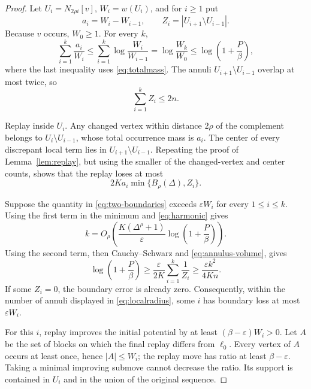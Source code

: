 \documentclass[11pt]{article}
\theoremstyle{definition}
\theoremstyle{remark}
\newcommand{\eps}{\varepsilon}
\newcommand{\N}{N}
\begin{document}
\begin{proof}
Let $U_i=\N_{2\rho i}[v]$, $W_i=w(U_i)$, and for $i\geq1$ put
\[
 a_i=W_i-W_{i-1},
 \qquad
 Z_i=|U_{i+1}\setminus U_{i-1}|.
\]
Because $v$ occurs, $W_0\geq1$.  For every $k$,
\begin{equation}\label{eq:harmonic}
 \sum_{i=1}^k\frac{a_i}{W_i}
 \leq \sum_{i=1}^k\log\frac{W_i}{W_{i-1}}
 =\log\frac{W_k}{W_0}
 \leq\log\!\left(1+\frac{P}{\beta}\right),
\end{equation}
where the last inequality uses \eqref{eq:totalmass}.  The annuli
$U_{i+1}\setminus U_{i-1}$ overlap at most twice, so
\begin{equation}\label{eq:annulus-volume}
 \sum_{i=1}^k Z_i\leq2n.
\end{equation}

Replay inside $U_i$.  Any changed vertex within distance $2\rho$ of the complement
belongs to $U_i\setminus U_{i-1}$, whose total occurrence mass is $a_i$.  The center
of every discrepant local term lies in $U_{i+1}\setminus U_{i-1}$.  Repeating the
proof of Lemma~\ref{lem:replay}, but using the smaller of the changed-vertex and
center counts, shows that the replay loses at most
\begin{equation}\label{eq:two-boundaries}
 2K a_i\min\{B_\rho(\Delta),Z_i\}.
\end{equation}

Suppose the quantity in \eqref{eq:two-boundaries} exceeds $\eps W_i$ for every
$1\leq i\leq k$.  Using the first term in the minimum and
\eqref{eq:harmonic} gives
\[
 k=O_\rho\!\left(
 \frac{K(\Delta^\rho+1)}{\eps}
 \log\!\left(1+\frac{P}{\beta}\right)\right).
\]
Using the second term, then Cauchy--Schwarz and
\eqref{eq:annulus-volume}, gives
\[
 \log\!\left(1+\frac{P}{\beta}\right)
 \geq \frac{\eps}{2K}\sum_{i=1}^k\frac1{Z_i}
 \geq \frac{\eps k^2}{4Kn}.
\]
If some $Z_i=0$, the boundary error is already zero.  Consequently, within the
number of annuli displayed in \eqref{eq:localradius}, some $i$ has boundary loss at
most $\eps W_i$.

For this $i$, replay improves the initial potential by at least
$(\beta-\eps)W_i>0$.  Let $A$ be the set of blocks on which the final replay differs
from $\ell_0$.  Every vertex of $A$ occurs at least once, hence $|A|\leq W_i$; the
replay move has ratio at least $\beta-\eps$.  Taking a minimal improving submove
cannot decrease the ratio.  Its support is contained in $U_i$ and in the union of
the original sequence.
\end{proof}
\end{document}
